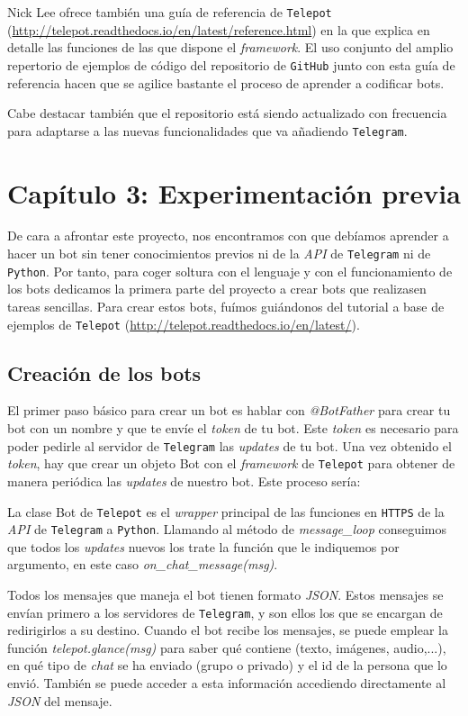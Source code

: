 \documentclass[oneside]{memoir}
\newcommand{\mychapter}[2]{
    \setcounter{chapter}{#1}
    \setcounter{section}{0}
    \chapter*{#2}
    \addcontentsline{toc}{chapter}{#2}
}
\begin{document}
Nick Lee ofrece también una guía de referencia de \texttt{Telepot} (\url{http://telepot.readthedocs.io/en/latest/reference.html}) en la que explica en detalle las funciones de las que dispone el \textit{framework}. El uso conjunto del amplio repertorio de ejemplos de código del repositorio de \texttt{GitHub} junto con esta guía de referencia hacen que se agilice bastante el proceso de aprender a codificar bots.

Cabe destacar también que el repositorio está siendo actualizado con frecuencia para adaptarse a las nuevas funcionalidades que va añadiendo \texttt{Telegram}.

\newpage
\mychapter{3}{Cap\'itulo 3: Experimentaci\'on previa}
De cara a afrontar este proyecto, nos encontramos con que debíamos aprender a hacer un bot sin tener conocimientos previos ni de la \textit{API} de \texttt{Telegram} ni de \texttt{Python}. Por tanto, para coger soltura con el lenguaje y con el funcionamiento de los bots dedicamos la primera parte del proyecto a crear bots que realizasen tareas sencillas. Para crear estos bots, fuímos guiándonos del tutorial a base de ejemplos de \texttt{Telepot} (\url{http://telepot.readthedocs.io/en/latest/}).

\section{Creación de los bots}
El primer paso básico para crear un bot es hablar con \textit{@BotFather} para crear tu bot con un nombre y que te envíe el \textit{token} de tu bot. Este \textit{token} es necesario para poder pedirle al servidor de \texttt{Telegram} las \textit{updates} de tu bot. Una vez obtenido el \textit{token}, hay que crear un objeto Bot con el \textit{framework} de \texttt{Telepot} para obtener de manera periódica las \textit{updates} de nuestro bot. Este proceso sería:



La clase Bot de \texttt{Telepot} es el \textit{wrapper} principal de las funciones en \texttt{HTTPS} de la \textit{API} de \texttt{Telegram} a \texttt{Python}. Llamando al método de \textit{message\_loop} conseguimos que todos los \textit{updates} nuevos los trate la función que le indiquemos por argumento, en este caso \textit{on\_chat\_message(msg)}.

Todos los mensajes que maneja el bot tienen formato \textit{JSON}. Estos mensajes se envían primero a los servidores de \texttt{Telegram}, y son ellos los que se encargan de redirigirlos a su destino. Cuando el bot recibe los mensajes, se puede emplear la función \textit{telepot.glance(msg)} para saber qué contiene (texto, imágenes, audio,...), en qué tipo de \textit{chat} se ha enviado (grupo o privado) y el id de la persona que lo envió. También se puede acceder a esta información accediendo directamente al \textit{JSON} del mensaje.

\end{document}
